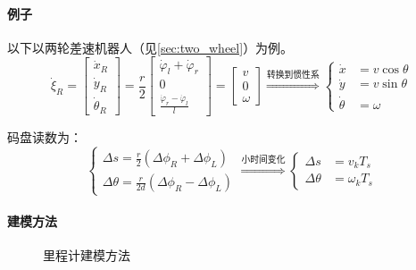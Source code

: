 \documentclass[
12pt, %
a4paper, 
oneside, %
headinclude,footinclude, %
]{scrartcl}
\begin{document}
\paragraph{例子}
以下以两轮差速机器人（见\ref{sec:two_wheel}）为例。
$$ 
\dot{\xi}_R = \begin{bmatrix} \dot{x}_R \\ \dot{y}_R \\ \dot{\theta}_R \end{bmatrix} = \frac{r}{2} \begin{bmatrix} \dot{\varphi}_l + \dot{\varphi}_r \\ 0 \\ \frac{\dot{\varphi}_r - \dot{\varphi}_l}{l} \end{bmatrix} = \begin{bmatrix} v \\ 0 \\ \omega \end{bmatrix} 
\overset{\text{转换到惯性系}}{\Longrightarrow}
\begin{cases} \dot{x} &= v \cos \theta \\ \dot{y} &= v \sin \theta \\ \dot{\theta} &= \omega \end{cases}
$$

码盘读数为：
$$ 
\begin{cases} \Delta s = \frac{r}{2}(\Delta \phi_R + \Delta \phi_L) \\ \Delta \theta = \frac{r}{2d}(\Delta \phi_R - \Delta \phi_L) \end{cases}
\overset{\text{小时间变化}}{\Longrightarrow}
\begin{cases} \Delta s &= v_k T_s \\ \Delta \theta &= \omega_k T_s \end{cases}   
$$ 
\paragraph{建模方法}
\begin{figure}[H]
\centering
{} \quad
\subfloat[RK2法]{\texttt{[image: rk2]}} \quad
{}
\caption{里程计建模方法}
\end{figure}
\end{document}
